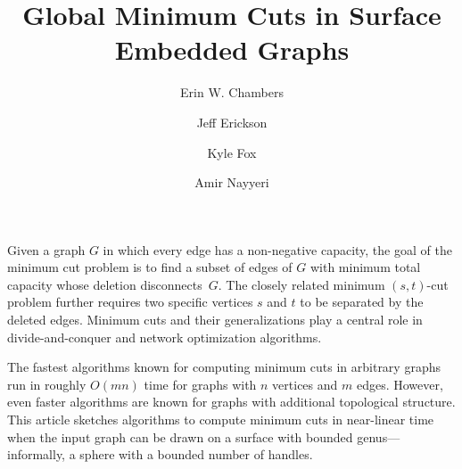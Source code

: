\documentclass[natbib]{svcyclop}
\begin{document}
\title{Global Minimum Cuts in Surface Embedded Graphs}


\author{
	Erin W. Chambers
\and
	Jeff Erickson
\and
	Kyle Fox
\and
	Amir Nayyeri}







\maketitle


\ProbDef

Given a graph $G$ in which every edge has a non-negative capacity, the goal of the minimum cut problem is to find a subset of edges of $G$ with minimum total capacity whose deletion disconnects~$G$.  The closely related minimum $(s,t)$-cut problem further requires two specific vertices $s$ and $t$ to be separated by the deleted edges.  Minimum cuts and their generalizations play a central role in divide-and-conquer and network optimization algorithms.

The fastest algorithms known for computing minimum cuts in arbitrary graphs run in roughly $O(mn)$ time for graphs with $n$ vertices and $m$ edges.  However, even faster algorithms are known for graphs with additional topological structure.  This article sketches algorithms to compute minimum cuts in near-linear time when the input graph can be drawn on a surface with bounded genus---informally, a sphere with a bounded number of handles. 
\end{document}
